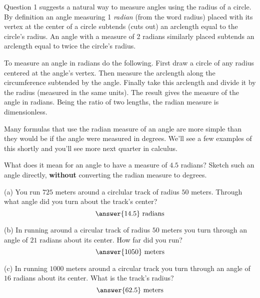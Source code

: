 \documentclass{ximera}
\begin{document}
Question 1 suggests a natural way to measure angles using the radius of a circle. By definition an angle measuring 1 \emph{radian} (from the word radius) placed with its vertex at the center of a circle subtends (cuts out) an arclength equal to the circle's radius. An angle with a measure of 2 radians similarly placed subtends an arclength equal to twice the circle's radius. 

To measure an angle in radians do the following. First draw a circle of any radius centered at the angle's vertex. Then measure the arclength along the circumference subtended by the angle. Finally take this arclength and divide it by the radius (measured in the same units). The result gives the measure of the angle in radians. Being the ratio of two lengths, the radian measure is dimensionless.

Many formulas that use the radian measure of an angle are more simple than they would be if the angle were measured in degrees. We'll see a few examples of this shortly and you'll see more next quarter in calculus.


\begin{question} \label{Q1:Radians}
What does it mean for an angle to have a measure of $4.5$ radians? Sketch such an angle directly, {\bf without} converting the radian measure to degrees.
\end{question}

\begin{question} \label{Q01:Radians}
(a) You run $725$ meters around a circlular track of radius $50$ meters. Through what angle did you turn about the track's center?
\[
    \answer{14.5} \text{ radians}
\]

(b) In running around a circular track of radius $50$ meters you turn through an angle of $21$ radians about its center. How far did you run?
\[
    \answer{1050} \text{ meters}
\]

(c) In running $1000$ meters around a circular track you turn through an angle of $16$ radians about its center. What is the track's radius?
\[
   \answer{62.5} \text{ meters}
\]

\end{question}
\end{document}
